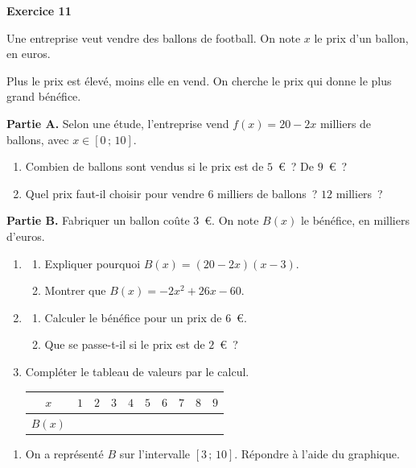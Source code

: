 \documentclass[a4paper,11pt]{article}
\newenvironment{exercice}[1]{%
  \Needspace{6\baselineskip}\par\bigskip\noindent\textbf{Exercice #1}\par\smallskip\noindent\ignorespaces
}{%
  \par
}
\begin{document}
\newpage
\begin{exercice}{11}
Une entreprise veut vendre des ballons de football. On note $x$ le prix d'un ballon, en euros.

Plus le prix est élevé, moins elle en vend. On cherche le prix qui donne le plus grand bénéfice.

\medskip
\textbf{Partie A.} Selon une étude, l'entreprise vend \mbox{$f(x) = 20 - 2x$} milliers de ballons, avec $x \in [0\,;\,10]$.
\begin{enumerate}[label=\arabic*.]
  \item Combien de ballons sont vendus si le prix est de $5$~€~? De $9$~€~?
  \item Quel prix faut-il choisir pour vendre $6$ milliers de ballons~? $12$ milliers~?
\end{enumerate}

\textbf{Partie B.} Fabriquer un ballon coûte $3$~€. On note $B(x)$ le bénéfice, en milliers d'euros.
\begin{enumerate}[label=\arabic*.]
  \item \begin{enumerate}[label=\alph*.]
    \item Expliquer pourquoi $B(x) = (20 - 2x)(x - 3)$.
    \item Montrer que $B(x) = -2x^2 + 26x - 60$.
  \end{enumerate}
  \item \begin{enumerate}[label=\alph*.]
    \item Calculer le bénéfice pour un prix de $6$~€.
    \item Que se passe-t-il si le prix est de $2$~€~?
  \end{enumerate}
  \item Compléter le tableau de valeurs par le calcul.

  \medskip
  \renewcommand{\arraystretch}{1.5}
  \begin{tabular}{|c|*{9}{C{1cm}|}}
    \hline
    $x$ & $1$ & $2$ & $3$ & $4$ & $5$ & $6$ & $7$ & $8$ & $9$ \\ \hline
    $B(x)$ & & & & & & & & & \\ \hline
  \end{tabular}
\end{enumerate}

\begin{enumerate}[label=\arabic*., start=4]
  \item On a représenté $B$ sur l'intervalle $[3\,;\,10]$. Répondre à l'aide du graphique.


\end{enumerate}
\end{exercice}
\end{document}
